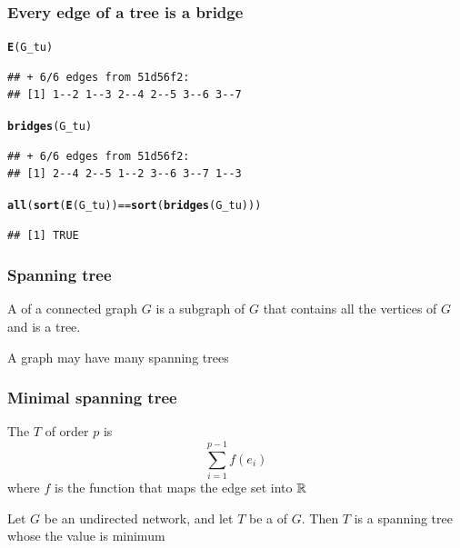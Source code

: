\documentclass[aspectratio=169]{beamer}\usepackage[]{graphicx}\usepackage[]{xcolor}
\makeatletter
\newcommand{\hlopt}[1]{\textcolor[rgb]{0,0,0}{#1}}%
\newcommand{\hldef}[1]{\textcolor[rgb]{0.345,0.345,0.345}{#1}}%
\newcommand{\hlkwd}[1]{\textcolor[rgb]{0.737,0.353,0.396}{\textbf{#1}}}%
\newenvironment{kframe}{%
 \def\at@end@of@kframe{}%
 \ifinner\ifhmode%
  \def\at@end@of@kframe{\end{minipage}}%
  \begin{minipage}{\columnwidth}%
 \fi\fi%
 \def\FrameCommand##1{\hskip\@totalleftmargin \hskip-\fboxsep
 \colorbox{shadecolor}{##1}\hskip-\fboxsep
     \hskip-\linewidth \hskip-\@totalleftmargin \hskip\columnwidth}%
 \MakeFramed {\advance\hsize-\width
   \@totalleftmargin\z@ \linewidth\hsize
   \@setminipage}}%
 {\par\unskip\endMakeFramed%
 \at@end@of@kframe}
\newenvironment{knitrout}{}{} %
\makeatother
\begin{document}
\begin{frame}[fragile]\frametitle{Every edge of a tree is a bridge}
\begin{knitrout}
\color{fgcolor}\begin{kframe}
\begin{alltt}
\hlkwd{E}\hldef{(G_tu)}
\end{alltt}
\begin{verbatim}
## + 6/6 edges from 51d56f2:
## [1] 1--2 1--3 2--4 2--5 3--6 3--7
\end{verbatim}
\begin{alltt}
\hlkwd{bridges}\hldef{(G_tu)}
\end{alltt}
\begin{verbatim}
## + 6/6 edges from 51d56f2:
## [1] 2--4 2--5 1--2 3--6 3--7 1--3
\end{verbatim}
\begin{alltt}
\hlkwd{all}\hldef{(}\hlkwd{sort}\hldef{(}\hlkwd{E}\hldef{(G_tu))} \hlopt{==} \hlkwd{sort}\hldef{(}\hlkwd{bridges}\hldef{(G_tu)))}
\end{alltt}
\begin{verbatim}
## [1] TRUE
\end{verbatim}
\end{kframe}
\end{knitrout}
\end{frame}


\begin{frame}\frametitle{Spanning tree}
	\begin{definition}
	A  of a connected graph $G$ is a subgraph of $G$ that contains all the vertices of $G$ and is a tree.
	\end{definition}
	\vfill
	A graph may have many spanning trees
\end{frame}


\begin{frame}\frametitle{Minimal spanning tree}
	\begin{definition}
	The  $T$ of order $p$ is
	$$\sum_{i=1}^{p-1}f(e_i)$$
	where $f$ is the function that maps the edge set into $\mathbb{R}$
	\end{definition}
	\vfill
	\begin{definition}
	Let $G$ be an undirected network, and let $T$ be a  of $G$. Then $T$ is a spanning tree whose the value is minimum
	\end{definition}
\end{frame}
\end{document}
